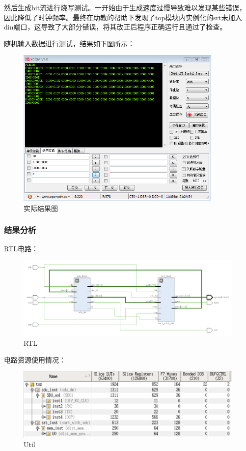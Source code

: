 \documentclass[a4paper]{article}
\begin{document}
然后生成bit流进行烧写测试。一开始由于生成速度过慢导致难以发现某些错误，因此降低了时钟频率。最终在助教的帮助下发现了top模块内实例化的srt未加入din端口，这导致了大部分错误，将其改正后程序正确运行且通过了检查。

随机输入数据进行测试，结果如下图所示：
\begin{figure}[H]
    \centering
    \includegraphics[width=0.9\textwidth]{top.png}
    \caption{实际结果图}
    \label{fig:top}
  \end{figure}

\subsubsection{结果分析}
RTL电路：
\begin{figure}[H]
    \centering
    \includegraphics[width=1.0\textwidth]{rtl.png}
    \caption{RTL}
    \label{fig:rtl}
  \end{figure}


电路资源使用情况：
\begin{figure}[H]
    \centering
    \includegraphics[width=1.0\textwidth]{util.png}
    \caption{Util}
    \label{fig:util}
  \end{figure}
\end{document}
